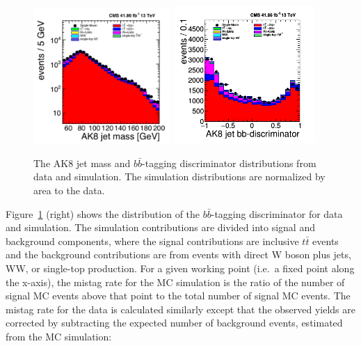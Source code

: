 \begin{figure}[hbp!]
\centering
\includegraphics[width=0.465\textwidth]{figs/ak8jetmass.png}
\includegraphics[width=0.48\textwidth]{figs/ak8jetbbdisc.png}
\caption[The AK8 jet mass and $b\bar{b}$-tagging discriminator distributions from data and simulation.]{The AK8 jet mass and $b\bar{b}$-tagging discriminator distributions from data and simulation. The simulation distributions are normalized by area to the data.}
\label{fig:dists}
\end{figure}

Figure~\ref{fig:dists} (right) shows the distribution of the $b\bar{b}$-tagging discriminator for data and simulation. The simulation contributions are divided into signal  and background components, where the signal contributions are inclusive $t\bar{t}$ events and the background contributions are from events with direct W boson plus jets, WW, or single-top production.  For a given working point (i.e.\ a fixed point along the x-axis), the mistag rate for the MC simulation is the ratio of the number of signal MC events above that point to the total number of signal MC events. The mistag rate for the data is calculated similarly except that the observed yields are corrected by subtracting the expected number of background events, estimated from the MC simulation:

